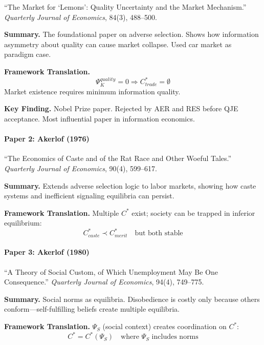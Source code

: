``The Market for `Lemons': Quality Uncertainty and the Market Mechanism.''
\textit{Quarterly Journal of Economics}, 84(3), 488--500.

\textbf{Summary.}
The foundational paper on adverse selection. Shows how information asymmetry 
about quality can cause market collapse. Used car market as paradigm case.

\textbf{Framework Translation.}
\begin{equation}
\Psi_K^{quality} = 0 \Rightarrow C^*_{trade} = \emptyset
\end{equation}
Market existence requires minimum information quality.

\textbf{Key Finding.}
Nobel Prize paper. Rejected by AER and RES before QJE acceptance. 
Most influential paper in information economics.

\paragraph{Paper 2: Akerlof (1976)}

``The Economics of Caste and of the Rat Race and Other Woeful Tales.''
\textit{Quarterly Journal of Economics}, 90(4), 599--617.

\textbf{Summary.}
Extends adverse selection logic to labor markets, showing how caste systems 
and inefficient signaling equilibria can persist.

\textbf{Framework Translation.}
Multiple $C^*$ exist; society can be trapped in inferior equilibrium:
\begin{equation}
C^*_{caste} \prec C^*_{merit} \quad \text{but both stable}
\end{equation}

\paragraph{Paper 3: Akerlof (1980)}

``A Theory of Social Custom, of Which Unemployment May Be One Consequence.''
\textit{Quarterly Journal of Economics}, 94(4), 749--775.

\textbf{Summary.}
Social norms as equilibria. Disobedience is costly only because others 
conform—self-fulfilling beliefs create multiple equilibria.

\textbf{Framework Translation.}
$\Psi_S$ (social context) creates coordination on $C^*$:
\begin{equation}
C^* = C^*(\Psi_S) \quad \text{where } \Psi_S \text{ includes norms}
\end{equation}

